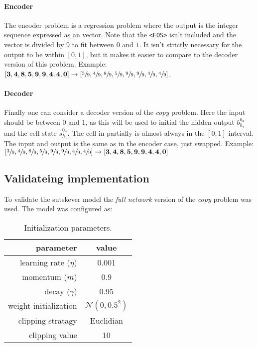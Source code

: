 \paragraph{Encoder} The encoder problem is a regression problem where the output is the integer sequence expressed as an vector. Note that the \texttt{<EOS>} isn't included and the vector is divided by 9 to fit between $0$ and $1$. It isn't strictly necessary for the output to be within $[0, 1]$, but it makes it easier to compare to the decoder version of this problem. Example: $[\mathbf{3}, \mathbf{4}, \mathbf{8}, \mathbf{5}, \mathbf{9}, \mathbf{9}, \mathbf{4}, \mathbf{4}, \mathbf{0}] \rightarrow [\sfrac{3}{9}, \sfrac{4}{9}, \sfrac{8}{9}, \sfrac{5}{9}, \sfrac{9}{9}, \sfrac{9}{9}, \sfrac{4}{9}, \sfrac{4}{9}]$.

\paragraph{Decoder} Finally one can consider a decoder version of the \textit{copy} problem. Here the input should be between $0$ and $1$, as this will be used to initial the hidden output $b_{h_1}^{0_d}$ and the cell state $s_{h_1}^{0_d}$. The cell in partially is almost always in the $[0, 1]$ interval. The input and output is the same as in the encoder case, just swapped. Example: $[\sfrac{3}{9}, \sfrac{4}{9}, \sfrac{8}{9}, \sfrac{5}{9}, \sfrac{9}{9}, \sfrac{9}{9}, \sfrac{4}{9}, \sfrac{4}{9}] \rightarrow [\mathbf{3}, \mathbf{4}, \mathbf{8}, \mathbf{5}, \mathbf{9}, \mathbf{9}, \mathbf{4}, \mathbf{4}, \mathbf{0}]$

\subsection{Validateing implementation}

To validate the sutskever model the \textit{full network} version of the \textit{copy} problem was used. The model was configured as:

\begin{table}[H]
\centering
\begin{tabular}{r|c}
	parameter & value \\ \hline
	learning rate ($\eta$) & 0.001 \\
	momentum ($m$) & 0.9 \\
	decay ($\gamma$) & 0.95 \\
	weight initialization & $\mathcal{N}(0, 0.5^2)$ \\
	clipping stratagy & Euclidian \\
	clipping value & 10
\end{tabular}
\caption{Initialization parameters.}
\end{table}

